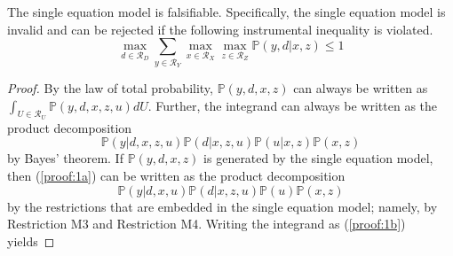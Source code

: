 \documentclass[10pt,a4paper,twoside]{article}
\numberwithin{equation}{section}
\begin{document}
The single equation model is falsifiable. Specifically, the single equation model is invalid and can be rejected if the following instrumental inequality \citep{p95b} is violated.
\begin{equation}
\max_{d\in\mathcal{R}_D}\sum_{y\in\mathcal{R}_Y}\max_{x\in\mathcal{R}_X}\max_{z\in\mathcal{R}_Z}\mathbb{P}(y,d|x,z)\leq 1\label{eq:false}
\end{equation}
\vspace{20pt} 
\begin{proof}
By the law of total probability, $\mathbb{P}(y,d,x,z)$ can always be written as $\int_{U\in\mathcal{R}_U}\mathbb{P}(y,d,x,z,u)dU$. Further, the integrand can always be written as the product decomposition 
\begin{equation}
\mathbb{P}(y|d,x,z,u)\mathbb{P}(d|x,z,u)\mathbb{P}(u|x,z)\mathbb{P}(x,z)\label{proof:1a}
\end{equation}
by Bayes' theorem. If $\mathbb{P}(y,d,x,z)$ is generated by the single equation model, then (\ref{proof:1a}) can be written as the product decomposition
\begin{equation}
\mathbb{P}(y|d,x,u)\mathbb{P}(d|x,z,u)\mathbb{P}(u)\mathbb{P}(x,z)\label{proof:1b}
\end{equation}
by the restrictions that are embedded in the single equation model; namely, by Restriction M3 and Restriction M4. Writing the integrand as (\ref{proof:1b}) yields 


\end{proof}
\end{document}
